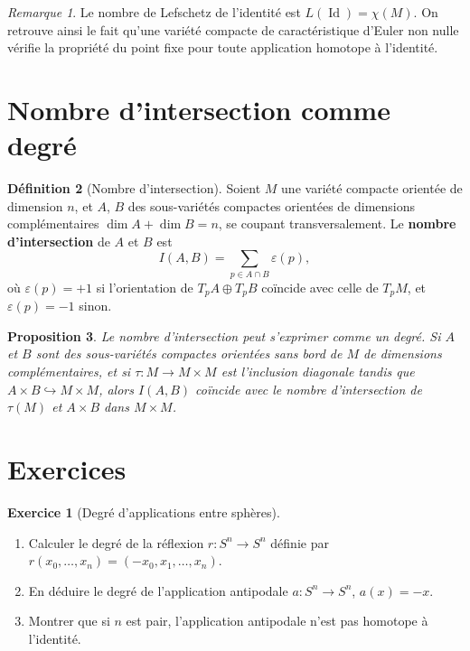 \documentclass[12pt,a4paper,openany]{book}
\theoremstyle{definition}
\newtheorem{definition}{Définition}[chapter]
\newtheorem{exercice}{Exercice}[chapter]
\theoremstyle{plain}
\newtheorem{proposition}[definition]{Proposition}
\theoremstyle{remark}
\newtheorem{remarque}[definition]{Remarque}
\DeclareMathOperator{\Id}{Id}
\begin{document}
\begin{remarque}
Le nombre de Lefschetz de l'identité est $L(\Id) = \chi(M)$. On retrouve ainsi
le fait qu'une variété compacte de caractéristique d'Euler non nulle vérifie la
propriété du point fixe pour toute application homotope à l'identité.
\end{remarque}

\section{Nombre d'intersection comme degré}\label{sec:intersection-degre}

\begin{definition}[Nombre d'intersection]\label{def:nombre-intersection}
Soient $M$ une variété compacte orientée de dimension $n$, et $A$, $B$ des
sous-variétés compactes orientées de dimensions complémentaires
$\dim A + \dim B = n$, se coupant transversalement. Le \textbf{nombre
d'intersection} de $A$ et $B$ est
\[
  I(A, B) = \sum_{p \in A \cap B} \varepsilon(p),
\]
où $\varepsilon(p) = +1$ si l'orientation de $T_pA \oplus T_pB$ coïncide avec
celle de $T_pM$, et $\varepsilon(p) = -1$ sinon.
\end{definition}

\begin{proposition}\label{prop:intersection-degre}
Le nombre d'intersection peut s'exprimer comme un degré. Si $A$ et $B$ sont des
sous-variétés compactes orientées sans bord de $M$ de dimensions complémentaires,
et si $\tau : M \to M \times M$ est l'inclusion diagonale tandis que
$A \times B \hookrightarrow M \times M$, alors $I(A, B)$ coïncide avec le
nombre d'intersection de $\tau(M)$ et $A \times B$ dans $M \times M$.
\end{proposition}

\section{Exercices}\label{sec:degre-exos}

\begin{exercice}[Degré d'applications entre sphères]\label{exo:degre-1}
\begin{enumerate}[label=(\alph*)]
  \item Calculer le degré de la réflexion $r : S^n \to S^n$ définie par
    $r(x_0, \ldots, x_n) = (-x_0, x_1, \ldots, x_n)$.
  \item En déduire le degré de l'application antipodale
    $a : S^n \to S^n$, $a(x) = -x$.
  \item Montrer que si $n$ est pair, l'application antipodale n'est pas
    homotope à l'identité.
\end{enumerate}
\end{exercice}
\end{document}
